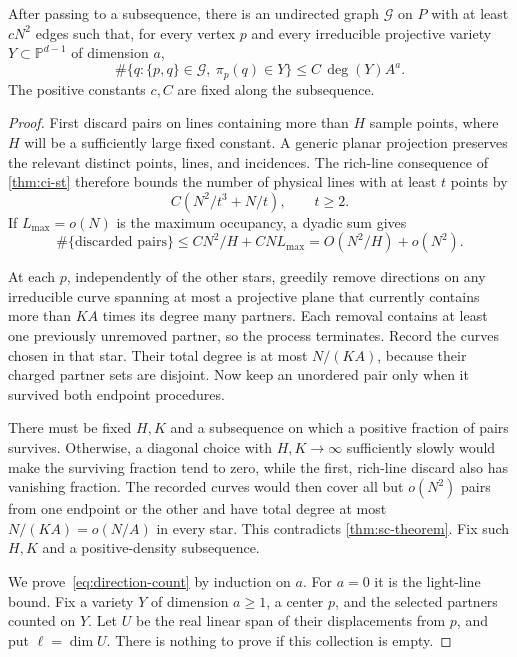 \begin{proposition}\label{prop:red-directions}
After passing to a subsequence, there is an undirected graph $\mathcal{G}$ on $P$ with at least $cN^2$ edges such that, for every vertex $p$ and every irreducible projective variety $Y\subset\mathbb{P}^{d-1}$ of dimension $a$,
\begin{equation}\label{eq:direction-count}
 \#\{q:\{p,q\}\in\mathcal{G},\ \pi_p(q)\in Y\}
 \le C\,\deg(Y)A^a.
\end{equation}
The positive constants $c,C$ are fixed along the subsequence.
\end{proposition}

\begin{proof}
First discard pairs on lines containing more than $H$ sample points, where $H$ will be a sufficiently large fixed constant. A generic planar projection preserves the relevant distinct points, lines, and incidences. The rich-line consequence of \cref{thm:ci-st} therefore bounds the number of physical lines with at least $t$ points by
\[
 C(N^2/t^3+N/t),\qquad t\ge2.
\]
If $L_{\max}=o(N)$ is the maximum occupancy, a dyadic sum gives
\[
 \#\{\text{discarded pairs}\}
 \le C N^2/H+C N L_{\max}=O(N^2/H)+o(N^2).
\]

At each $p$, independently of the other stars, greedily remove directions on any irreducible curve spanning at most a projective plane that currently contains more than $K A$ times its degree many partners. Each removal contains at least one previously unremoved partner, so the process terminates. Record the curves chosen in that star. Their total degree is at most $N/(KA)$, because their charged partner sets are disjoint. Now keep an unordered pair only when it survived both endpoint procedures.

There must be fixed $H,K$ and a subsequence on which a positive fraction of pairs survives. Otherwise, a diagonal choice with $H,K\to\infty$ sufficiently slowly would make the surviving fraction tend to zero, while the first, rich-line discard also has vanishing fraction. The recorded curves would then cover all but $o(N^2)$ pairs from one endpoint or the other and have total degree at most $N/(KA)=o(N/A)$ in every star. This contradicts \cref{thm:sc-theorem}. Fix such $H,K$ and a positive-density subsequence.

We prove~\eqref{eq:direction-count} by induction on $a$. For $a=0$ it is the light-line bound. Fix a variety $Y$ of dimension $a\ge1$, a center $p$, and the selected partners counted on $Y$. Let $U$ be the real linear span of their displacements from $p$, and put $\ell=\dim U$. There is nothing to prove if this collection is empty.


\end{proof}

